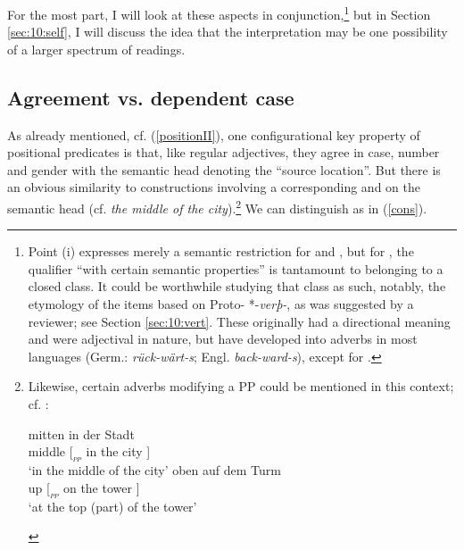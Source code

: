\documentclass[output=paper,colorlinks,citecolor=brown]{langscibook}
\begin{document}
For the most part, I will look at these aspects in conjunction,\footnote{Point (i) expresses merely a semantic restriction for  and , but for , the qualifier ``with certain semantic properties'' is tantamount to belonging to a closed class. It could be worthwhile studying that class as such, notably, the etymology of the items based on Proto- *-\textit{verþ-}, as was suggested by a reviewer; see Section \ref{sec:10:vert}. These originally had a directional meaning and were adjectival in nature, but have developed into adverbs in most  languages (Germ.: \textit{rück-wärt-s}; Engl. \textit{back-ward-s}), except for . } but in Section \ref{sec:10:self}, I will discuss the idea that the  interpretation may be one possibility of a larger spectrum of readings.



\subsection{Agreement vs. dependent case} 
\label{sec:10:AGR}

As already mentioned, cf. (\ref{positionII}), one configurational key property of positional predicates is that, like regular adjectives, they agree in case, number and gender with the semantic head  denoting the ``source location''.  
 But there is an obvious similarity to constructions involving a corresponding  and  on the semantic head  (cf.  \textit{the middle of the city}).\footnote{Likewise, certain adverbs modifying a PP could be mentioned in this context; cf.  :
\begin{multicols}{2}{
\begin{exe}
 \ex
   \begin{xlist}
     \ex \gll mitten \phantom{[$_{_{PP}}$ }in der Stadt    \\ 
        middle  {[$_{_{PP}}$  in} the city ] \\ 
        \glt  `in the middle of the city'
      \gll oben \phantom{[$_{_{PP}}$ }auf dem Turm   \\
         up  {[$_{_{PP}}$ }on the tower ] \\ 
        \glt `at the top (part) of the tower'
   \end{xlist}
\end{exe} }
\end{multicols}
}  We can distinguish as in (\ref{cons}).
\end{document}
